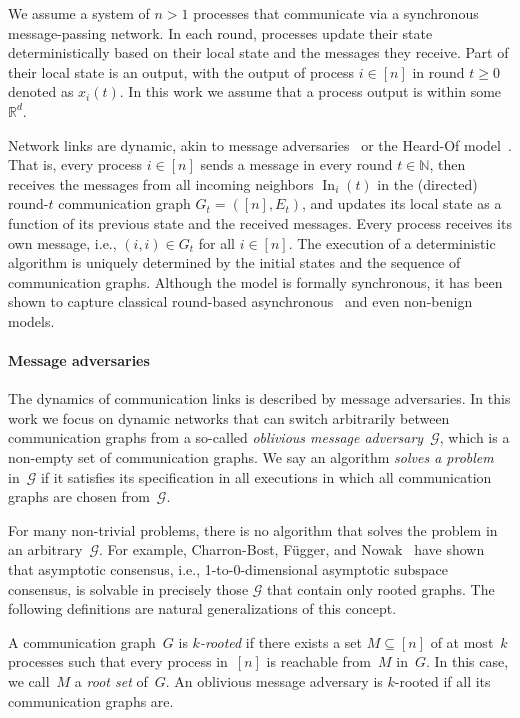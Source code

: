 \documentclass[preprint,12pt,a4paper]{elsarticle}
\theoremstyle{plain}
\theoremstyle{definition}
\newcommand{\N}{\mathcal{G}}
\newcommand{\IR}{\mathbb{R}}
\newcommand{\IN}{\mathbb{N}}
\renewcommand{\geq}{\geqslant}
\DeclareMathOperator\In{In}
\begin{document}
We assume a system of $n > 1$ processes that communicate via a synchronous message-passing network.
In each round, processes update their state deterministically based on their local state and the
messages they receive.
Part of their local state is an output, with the output of process $i \in [n]$ in round $t \geq 0$ denoted as $x_i(t)$.
In this work we assume that a process output is within some $\IR^d$.

Network links are dynamic, akin to message adversaries~\cite{afek13:asynchrony} or the Heard-Of
model~\cite{charron09:HO}.
That is, every process $i\in[n]$ sends a message in every round $t\in\IN$,
then receives the messages from all incoming neighbors $\In_i(t)$ in the (directed)
round-$t$ communication graph $G_t=([n],E_t)$, and updates its local state as a function
of its previous state and the received messages.
Every process receives its own message, i.e., $(i,i)\in G_t$ for all $i\in[n]$.
The execution of a deterministic algorithm is uniquely determined by the
initial states and the sequence of communication graphs.
Although the model is formally synchronous, it has been shown to capture
classical round-based asynchronous~\cite{charron09:HO} and even non-benign~\cite{biely07:tolerating,mendes15:multidimensional} models.


\paragraph*{Message adversaries}

The dynamics of communication links is described by message adversaries.
In this work we focus on dynamic networks that can switch arbitrarily between communication graphs from a so-called \emph{oblivious message adversary}~$\N$, which is a non-empty set of communication graphs.
We say an algorithm \emph{solves a problem} in~$\N$ if it satisfies its specification in all executions in which all communication graphs are chosen from~$\N$.

For many non-trivial problems, there is no algorithm that solves the problem in an arbitrary~$\N$.
For example, Charron-Bost, Függer, and Nowak~\cite{CBFN15:icalp} have shown that asymptotic consensus,
i.e., 1-to-0-dimensional asymptotic subspace consensus, is
solvable in precisely those $\N$ that contain only rooted graphs.
The following definitions are natural generalizations of this concept.

A communication graph~$G$ is \emph{$k$-rooted} if there exists a set
$M\subseteq[n]$ of at most~$k$ processes such that every process in~$[n]$
is reachable from~$M$ in~$G$.
In this case, we call~$M$ a \emph{root set} of~$G$.
An oblivious message adversary is $k$-rooted if all its communication graphs are.
\end{document}

